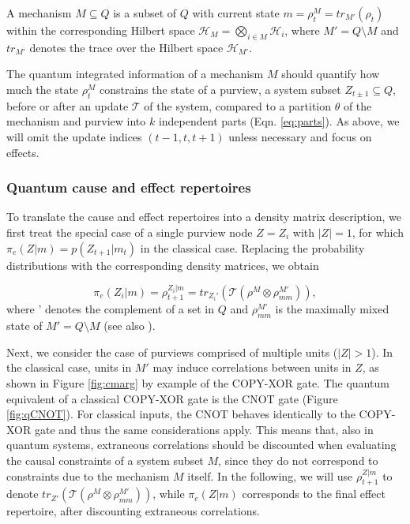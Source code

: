 \documentclass[preprints, article, accept, pdftex, moreauthors, letterpaper]{Definitions/mdpi}
\renewcommand{\=}[1]{\stackrel{#1}{=}} %
\renewcommand{\H}{\mathcal{H}} %
\newcommand{\T}{\mathcal{T}} %
\newcommand{\p}{\theta} %
\newcommand{\rmm}{\rho_{mm}}
\renewcommand{\*}{\otimes}%
\begin{document}
A mechanism $M \subseteq Q$ is a subset of $Q$ with current state $m = \rho^M_t = tr_{M'}(\rho_t)$ within the corresponding Hilbert space $\H_M = \bigotimes_{i \in M} \H_i$, where $M' = Q \setminus M$ and $tr_{M'}$ denotes the trace over the Hilbert space $\H_{M'}$. 

The quantum integrated information of a mechanism $M$ should quantify how much the state $\rho^M_t$ constrains the state of a purview, a system subset $Z_{t \pm 1} \subseteq Q$, before or after an update $\T$ of the system, compared to a partition $\p$ of the mechanism and purview into $k$ independent parts (Eqn. \eqref{eq:parts}). As above, we will omit the update indices $(t-1, t, t+1)$ unless necessary and focus on effects.

\subsubsection{Quantum cause and effect repertoires}

To translate the cause and effect repertoires into a density matrix description, we first treat the special case of a single purview node $Z = Z_i$ with $|Z| = 1$, for which $\pi_e(Z|m) = p(Z_{t+1}|m_t)$ in the classical case. Replacing the probability distributions with the corresponding density matrices, we obtain 

\begin{equation}
\label{eq:q_pi_e_single}
    \pi_e(Z_i|m) = \rho^{Z_i|m}_{t+1} = tr_{Z_i'}\left(\T(\rho^M \otimes \rmm^{M'})\right), 
\end{equation}
%
where ' denotes the complement of a set in $Q$ and $\rmm^{M'}$ is the maximally mixed state of $M' = Q \setminus M$ (see also \cite{Kleiner2021, Zanardi2018}). 

Next, we consider the case of purviews comprised of multiple units ($|Z| > 1$). In the classical case, units in $M'$ may induce correlations between units in $Z$, as shown in Figure \ref{fig:cmarg} by example of the COPY-XOR gate. The quantum equivalent of a classical COPY-XOR gate is the CNOT gate (Figure \ref{fig:qCNOT}). For classical inputs, the CNOT behaves identically to the COPY-XOR gate and thus the same considerations apply. This means that, also in quantum systems, extraneous correlations should be discounted when evaluating the causal constraints of a system subset $M$, since they do not correspond to constraints due to the mechanism $M$ itself. In the following, we will use $\rho^{Z|m}_{t+1}$ to denote $tr_{Z'}\left(\T(\rho^M \otimes \rmm^{M'})\right)$, while $\pi_e(Z|m)$ corresponds to the final effect repertoire, after discounting extraneous correlations.
\end{document}
